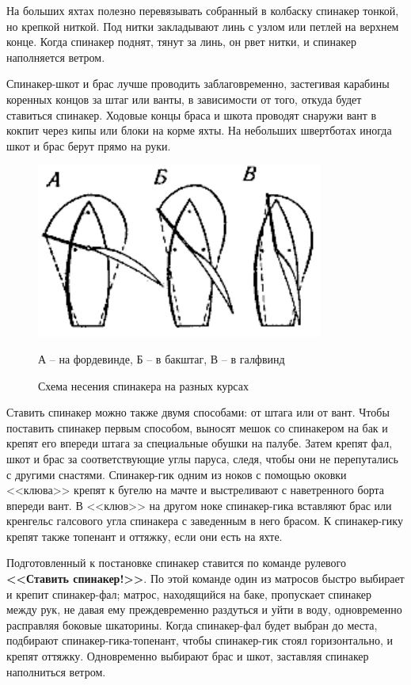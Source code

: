 \documentclass[a4paper, 12pt, twoside, final]{scrbook}
\begin{document}
На больших яхтах полезно перевязывать собранный в колбаску спинакер тонкой, но крепкой ниткой. Под нитки закладывают линь с узлом или петлей на верхнем конце. Когда спинакер поднят, тянут за линь, он рвет нитки, и спинакер наполняется ветром.

Спинакер-шкот и брас лучше проводить заблаговременно, застегивая карабины коренных концов за штаг или ванты, в зависимости от того, откуда будет ставиться спинакер. Ходовые концы браса и шкота проводят снаружи вант в кокпит через кипы или блоки на корме яхты. На небольших швертботах иногда шкот и брас берут прямо на руки.

\begin{figure}
	\centering
	\includegraphics[scale=1.3]{114_Shema_nesenija_spinakera}
	\caption{Схема несения спинакера на разных курсах}
	\label{fig:114}
	\centering\small
	А \--- на фордевинде, Б \--- в бакштаг, В \--- в галфвинд
\end{figure}

Ставить спинакер можно также двумя способами: от штага или от вант. Чтобы поставить спинакер первым способом, выносят мешок со спинакером на бак и крепят его впереди штага за специальные обушки на палубе. Затем крепят фал, шкот и брас за соответствующие углы паруса, следя, чтобы они не перепутались с другими снастями. Спинакер-гик одним из ноков с помощью оковки <<клюва>> крепят к бугелю на мачте и выстреливают с наветренного борта впереди вант. В <<клюв>> на другом ноке спинакер-гика вставляют брас или кренгельс галсового угла спинакера с заведенным в него брасом. К спинакер-гику крепят также топенант и оттяжку, если они есть на яхте.

Подготовленный к постановке спинакер ставится по команде рулевого \textbf{<<Ставить спинакер!>>}. По этой команде один из матросов быстро выбирает и крепит спинакер-фал; матрос, находящийся на баке, пропускает спинакер между рук, не давая ему преждевременно раздуться и уйти в воду, одновременно расправляя боковые шкаторины. Когда спинакер-фал будет выбран до места, подбирают спинакер-гика-топенант, чтобы спинакер-гик стоял горизонтально, и крепят оттяжку. Одновременно выбирают брас и шкот, заставляя спинакер наполниться ветром.
\end{document}
